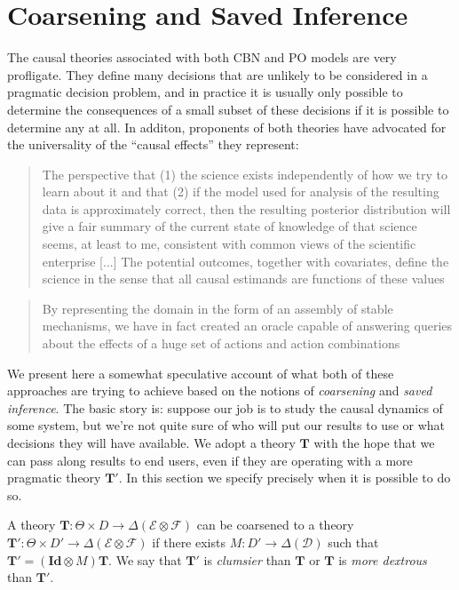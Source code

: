 
\section{Coarsening and Saved Inference}

The causal theories associated with both CBN and PO models are very profligate. They define many decisions that are unlikely to be considered in a pragmatic decision problem, and in practice it is usually only possible to determine the consequences of a small subset of these decisions if it is possible to determine any at all. In additon, proponents of both theories have advocated for the universality of the ``causal effects'' they represent:

\begin{quote}
The perspective that (1) the science exists independently of how we try to learn about it and that (2) if the model used for analysis of the resulting data is approximately correct, then the resulting posterior distribution will give a fair summary of the current state of knowledge of that science seems, at least to me, consistent with common views of the scientific enterprise
[...]
The potential outcomes, together with covariates, define the science in the sense that all causal estimands are functions of these values \citep{rubin_causal_2005}
\end{quote}

\begin{quote}
By representing the domain in the form of an assembly of stable mechanisms, we have in fact created an oracle capable of answering queries about the effects of a huge set of actions and action combinations \citep{pearl_causality:_2009}
\end{quote}

We present here a somewhat speculative account of what both of these approaches are trying to achieve based on the notions of \emph{coarsening} and \emph{saved inference}. The basic story is: suppose our job is to study the causal dynamics of some system, but we're not quite sure of who will put our results to use or what decisions they will have available. We adopt a theory $\mathbf{T}$ with the hope that we can pass along results to end users, even if they are operating with a more pragmatic theory $\mathbf{T}'$. In this section we specify precisely when it is possible to do so.

\begin{definition}[Coarsening]
A theory $\mathbf{T}:\Theta\times D\to \Delta(\mathcal{E}\otimes\mathcal{F})$ can be coarsened to a theory $\mathbf{T}':\Theta\times D'\to \Delta(\mathcal{E}\otimes\mathcal{F})$ if there exists $M:D'\to \Delta(\mathcal{D})$ such that $\mathbf{T}'  = (\mathbf{Id} \otimes M) \mathbf{T}$. We say that $\mathbf{T}'$ is \emph{clumsier} than $\mathbf{T}$ or $\mathbf{T}$ is \emph{more dextrous} than $\mathbf{T}'$.
\end{definition}

